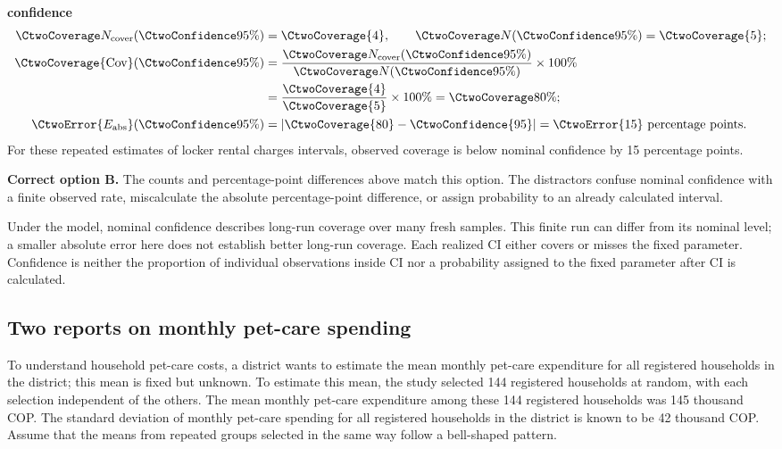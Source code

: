 \textbf{ confidence}\nopagebreak[4]
\begin{align*}
\CtwoCoverCount(\CtwoConfidence{95\%})&=\CtwoCoverage{4},
\qquad\CtwoTotalCount(\CtwoConfidence{95\%})=\CtwoCoverage{5};\\
\CtwoCoverage{\mathrm{Cov}}(\CtwoConfidence{95\%})
&=\frac{\CtwoCoverCount(\CtwoConfidence{95\%})}{\CtwoTotalCount(\CtwoConfidence{95\%})}\times100\%
\\
&=\frac{\CtwoCoverage{4}}{\CtwoCoverage{5}}\times100\%=\CtwoCoverage{80\%};\\
\CtwoError{E_{\rm abs}}(\CtwoConfidence{95\%})
&=\left|\CtwoCoverage{80}-\CtwoConfidence{95}\right|=\CtwoError{15}\ \text{percentage points}.
\end{align*}
For these repeated estimates of locker rental charges intervals, observed coverage is below nominal confidence by 15 percentage points.

\textbf{Correct option B.} The counts and percentage-point differences above match this option. The distractors confuse nominal confidence with a finite observed rate, miscalculate the absolute percentage-point difference, or assign probability to an already calculated interval.

Under the model, nominal confidence describes long-run coverage over many fresh samples. This finite run can differ from its nominal level; a smaller absolute error here does not establish better long-run coverage. Each realized $\mathrm{CI}$ either covers or misses the fixed parameter. Confidence is neither the proportion of individual observations inside $\mathrm{CI}$ nor a probability assigned to the fixed parameter after $\mathrm{CI}$ is calculated.
\par\nopagebreak[4]
\par\vspace{3mm}
\clearpage
\subsection{Two reports on monthly pet-care spending}
\label{prob:c2-2}

To understand household pet-care costs, a district wants to estimate the mean monthly pet-care expenditure for all registered households in the district; this mean is fixed but unknown. To estimate this mean, the study selected 144 registered households at random, with each selection independent of the others. The mean monthly pet-care expenditure among these 144 registered households was 145 thousand COP. The standard deviation of monthly pet-care spending for all registered households in the district is known to be 42 thousand COP. Assume that the means from repeated groups selected in the same way follow a bell-shaped pattern.

